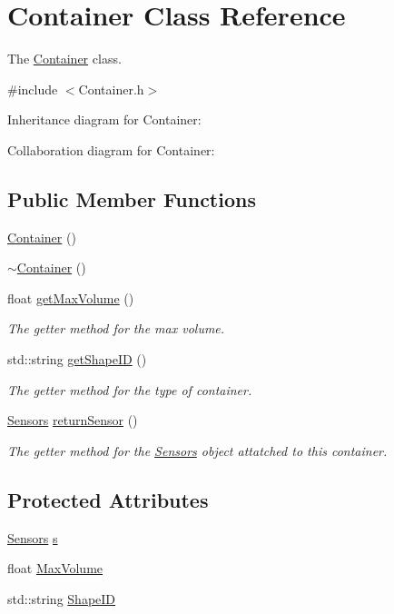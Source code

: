 \hypertarget{classContainer}{}\section{Container Class Reference}
\label{classContainer}


The \hyperlink{classContainer}{Container} class.  




{\ttfamily \#include $<$Container.\+h$>$}



Inheritance diagram for Container\+:


Collaboration diagram for Container\+:
\subsection*{Public Member Functions}
\begin{DoxyCompactItemize}
\item 
\hyperlink{classContainer_a1b0c5515d6863c1bc98cc93b65952f42}{Container} ()
\item 
\hyperlink{classContainer_ae9f5d07bfc3defda274aa06091c19f56}{$\sim$\+Container} ()
\item 
float \hyperlink{classContainer_ae822b32fdb80e41ffe4bfa7fab56408b}{get\+Max\+Volume} ()
\begin{DoxyCompactList}\small\item\em The getter method for the max volume. \end{DoxyCompactList}\item 
std\+::string \hyperlink{classContainer_a871bd6043bad7e483f1e1c8060849271}{get\+Shape\+ID} ()
\begin{DoxyCompactList}\small\item\em The getter method for the type of container. \end{DoxyCompactList}\item 
\hyperlink{classSensors}{Sensors} \hyperlink{classContainer_a48995d9018fd74cc78f25f4e9abf2617}{return\+Sensor} ()
\begin{DoxyCompactList}\small\item\em The getter method for the \hyperlink{classSensors}{Sensors} object attatched to this container. \end{DoxyCompactList}\end{DoxyCompactItemize}
\subsection*{Protected Attributes}
\begin{DoxyCompactItemize}
\item 
\hyperlink{classSensors}{Sensors} \hyperlink{classContainer_a5f70d3b0713aff689d525e30ca1c9238}{s}
\item 
float \hyperlink{classContainer_a31011c5bc823f6dc403a67617c04ef23}{Max\+Volume}
\item 
std\+::string \hyperlink{classContainer_acf404f2619a77f41c70cc7a562381855}{Shape\+ID}
\end{DoxyCompactItemize}


